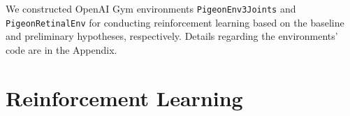 We constructed OpenAI Gym environments \lstinline|PigeonEnv3Joints| and \lstinline|PigeonRetinalEnv| for conducting reinforcement learning based on the baseline and preliminary hypotheses, respectively.
  Details regarding the environments' code are in the Appendix.

\section{Reinforcement Learning}
